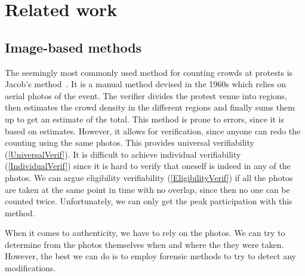 \mode*
\section{Related work}
\label{RelatedWork}

\subsection<presentation>{Image-based methods}

The seemingly most commonly used method for counting crowds at protests is 
Jacob's method~\cite[c.f.][]{%
  2016DemonstrationsInSeoul,%
  BBCHowToCountProtestNumbers,%
  HowWillWeKnowTrumpInauguralCrowdSize,%
  TheXManMarch,%
  TheCrowdNumbersGame,%
}.
It is a manual method devised in the 1960s which relies on aerial photos of the 
event.
The verifier divides the protest venue into regions, then estimates the crowd 
density in the different regions and finally sums them up to get an estimate of 
the total.
This method is prone to errors, since it is based on estimates.
However, it allows for verification, since anyone can redo the counting using 
the same photos.
This provides universal verifiability (\cref{UniversalVerif}).
It is difficult to achieve individual verifiability (\cref{IndividualVerif}) 
since it is hard to verify that oneself is indeed in any of the photos.
We can argue eligibility verifiability (\cref{EligibilityVerif}) if all the 
photos are taken at the same point in time with no overlap, since then no one 
can be counted twice.
Unfortunately, we can only get the peak participation with this method.

When it comes to authenticity, we have to rely on the photos.
We can try to determine from the photos themselves when and where the they were 
taken.
However, the best we can do is to employ forensic methods to try to detect any 
modifications.

